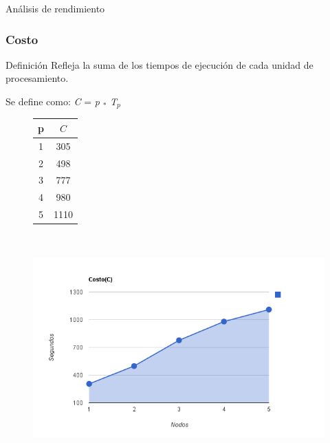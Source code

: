 \begin{subsection}{Análisis de rendimiento}
\begin{frame}
\end{frame}

\begin{frame}\frametitle{Costo}

\begin{block}{Definición}
Refleja la suma de los tiempos de ejecución de cada unidad de procesamiento.
\end{block}

Se define como: \textit{C} = \textit{p} $_*$ \textit{T$_{p}$}
\begin{center}
\begin{figure}[!ht]
	\begin{minipage}{2,0cm}
    \begin{flushright}
    \begin{tabular*}{1,8cm}{c@{\extracolsep{\fill}}c}
        \hline
        \textbf{p} & \textbf{$C$} \\ \hline 
        1  & 305 \\ \hline
        2  & 498 \\ \hline
        3  & 777 \\ \hline
        4  & 980 \\ \hline
        5  & 1110 \\ \hline
    \end{tabular*}
    \end{flushright}
    \end{minipage}
    \    \ \hfill
    \begin{minipage}{8cm}
    \includegraphics[scale=0.35]{images/Grafico_Costo.png}\\
    \end{minipage}
\end{figure}
\end{center}
\end{frame}


\end{subsection}
